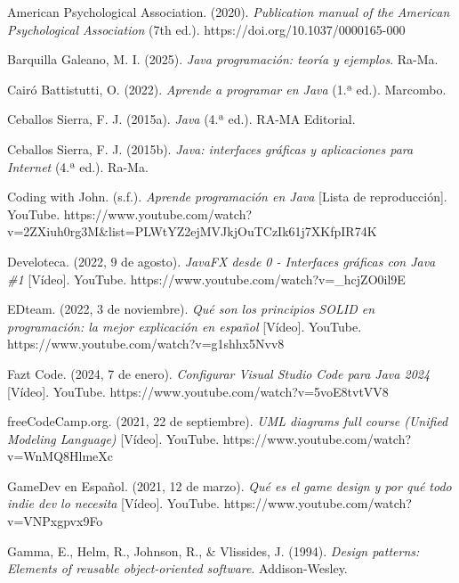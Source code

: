 \documentclass[stu,12pt,floatsintext]{apa7}
\begin{document}
\begin{thebibliography}{}

American Psychological Association. (2020). \textit{Publication manual of the American Psychological Association} (7th ed.). https://doi.org/10.1037/0000165-000

Barquilla Galeano, M. I. (2025). \textit{Java programación: teoría y ejemplos}. Ra-Ma.

Cairó Battistutti, O. (2022). \textit{Aprende a programar en Java} (1.ª ed.). Marcombo.

Ceballos Sierra, F. J. (2015a). \textit{Java} (4.ª ed.). RA-MA Editorial.

Ceballos Sierra, F. J. (2015b). \textit{Java: interfaces gráficas y aplicaciones para Internet} (4.ª ed.). Ra-Ma.

Coding with John. (s.f.). \textit{Aprende programación en Java} [Lista de reproducción]. YouTube. https://www.youtube.com/watch?v=2ZXiuh0rg3M\&list=PLWtYZ2ejMVJkjOuTCzIk61j7XKfpIR74K

Develoteca. (2022, 9 de agosto). \textit{JavaFX desde 0 - Interfaces gráficas con Java \#1} [Vídeo]. YouTube. https://www.youtube.com/watch?v=\_hcjZO0il9E

EDteam. (2022, 3 de noviembre). \textit{Qué son los principios SOLID en programación: la mejor explicación en español} [Vídeo]. YouTube. https://www.youtube.com/watch?v=g1shhx5Nvv8

Fazt Code. (2024, 7 de enero). \textit{Configurar Visual Studio Code para Java 2024} [Vídeo]. YouTube. https://www.youtube.com/watch?v=5voE8tvtVV8

freeCodeCamp.org. (2021, 22 de septiembre). \textit{UML diagrams full course (Unified Modeling Language)} [Vídeo]. YouTube. https://www.youtube.com/watch?v=WnMQ8HlmeXc

GameDev en Español. (2021, 12 de marzo). \textit{Qué es el game design y por qué todo indie dev lo necesita} [Vídeo]. YouTube. https://www.youtube.com/watch?v=VNPxgpvx9Fo

Gamma, E., Helm, R., Johnson, R., \& Vlissides, J. (1994). \textit{Design patterns: Elements of reusable object-oriented software}. Addison-Wesley.


\end{thebibliography}
\end{document}
